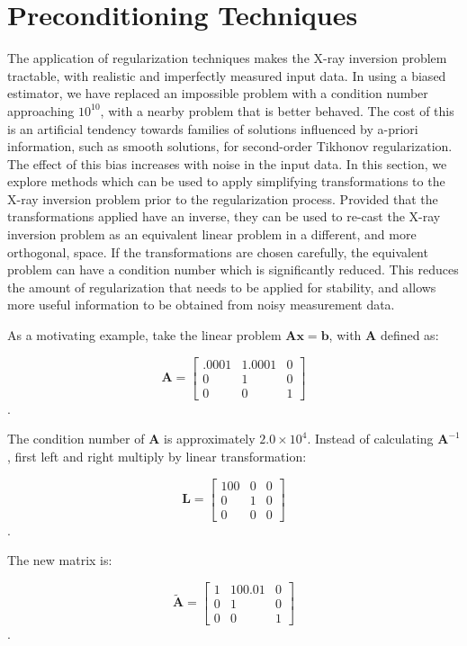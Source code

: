 \section{Preconditioning Techniques}

The application of regularization techniques makes the X-ray inversion problem tractable, with realistic and imperfectly measured input data. In using a biased estimator, we have replaced an impossible problem with a condition number approaching $10^{10}$, with a nearby problem that is better behaved. The cost of this is an artificial tendency towards families of solutions influenced by a-priori information, such as smooth solutions, for second-order Tikhonov regularization. The effect of this bias increases with noise in the input data. In this section, we explore methods which can be used to apply simplifying transformations to the X-ray inversion problem prior to the regularization process. Provided that the transformations applied have an inverse, they can be used to re-cast the X-ray inversion problem as an equivalent linear problem in a different, and more orthogonal, space. If the transformations are chosen carefully, the equivalent problem can have a condition number which is significantly reduced. This reduces the amount of regularization that needs to be applied for stability, and allows more useful information to be obtained from noisy measurement data. 

As a motivating example, take the linear problem $\mathbf{A}\mathbf{x} = \mathbf{b}$, with $\mathbf{A}$ defined as:

\[
\mathbf{A} = \begin{bmatrix} 
    .0001 & 1.0001 & 0 \\
    0 & 1 & 0 \\
    0 & 0 & 1
    \end{bmatrix}
\].

The condition number of $\mathbf{A}$ is approximately $2.0\times10^{4}$. Instead of calculating $\mathbf{A}^{-1}$, first left and right multiply by linear transformation:

\[
\mathbf{L} = \begin{bmatrix} 
    100 & 0 & 0  \\
    0 & 1  & 0 \\
    0 & 0 & 0
    \end{bmatrix}
\].

The new matrix is:

\[
\mathbf{\tilde{A}} = \begin{bmatrix} 
    1 & 100.01 & 0  \\
    0 & 1  & 0 \\
    0 & 0 & 1
    \end{bmatrix}
\].

